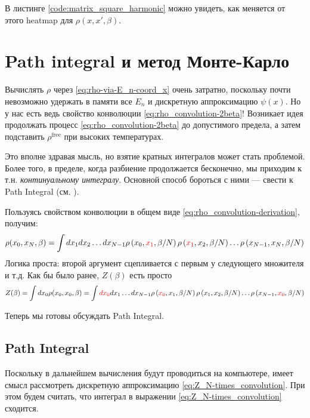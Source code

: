 \begin{lecture}
В листинге \ref{code:matrix_square_harmonic} можно увидеть, как меняется от этого heatmap для $\rho (x, x', \beta)$.


\section{Path integral и метод Монте-Карло}
Вычислять $\rho$ через \eqref{eq:rho-via-E_n-coord_x} очень затратно, поскольку почти невозможно удержать в памяти все $E_n$ и дискретную аппроксимацию $\psi (x)$.
Но у нас есть ведь свойство конволюции \eqref{eq:rho_convolution-2beta}!
Возникает идея продолжать процесс \eqref{eq:rho_convolution-2beta} до допустимого предела, а затем подставить $\rho^{\text{free}} $ при высоких температурах.

Это вполне здравая мысль, но взятие кратных интегралов может стать проблемой.
Более того, в пределе, когда разбиение продолжается бесконечно, мы приходим к т.н. \textit{континуальному интегралу}.
Основной способ бороться с ними --- свести к Path Integral (см. \cite{feynman}).

Пользуясь свойством конволюции в общем виде \eqref{eq:rho_convolution-derivation}, получим:
\begin{equation}
    \label{eq:rho_convolution_N-times}
    \rho (x_0, x_N, \beta) =
    \int d x_{1} d x_{2} \ldots d x_{N-1} \rho\left(x_{0}, {\color{red}x_{1}}, \beta / N\right) \rho\left({\color{red} x_{1}}, x_{2}, \beta / N\right) \ldots \rho\left(x_{N-1}, x_{N}, \beta / N\right)
\end{equation}
Логика проста: второй аргумент сцепливается с первым у следующего множителя и т.д.
Как бы было ранее, $Z (\beta)$ есть просто
\begin{equation}
    \label{eq:Z_N-times_convolution}
    Z (\beta) = \int dx_0 \rho (x_0, x_0, \beta) =
    \int {\color{red} d x_{0}} d x_{1} \ldots d x_{N-1} \rho\left({\color{red} x_{0}}, x_{1}, \beta / N\right) \rho\left(x_{1}, x_{2}, \beta / N\right) \ldots \rho\left(x_{N-1}, {\color{red} x_{0}}, \beta / N\right)
\end{equation}

Теперь мы готовы обсуждать Path Integral.

\subsection{Path Integral}
Поскольку в дальнейшем вычисления будут проводиться на компьютере, имеет смысл рассмотреть дискретную аппроксимацию \eqref{eq:Z_N-times_convolution}. При этом будем считать, что интеграл в выражении \eqref{eq:Z_N-times_convolution} сходится.


\end{lecture}
